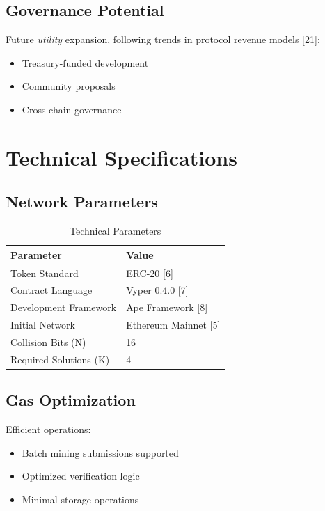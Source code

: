 \documentclass[11pt,a4paper]{article}
\begin{document}
\subsection{Governance Potential}

Future \textit{utility} expansion, following trends in protocol revenue models [21]:
\begin{itemize}
    \item Treasury-funded development
    \item Community proposals
    \item Cross-chain governance
\end{itemize}

\section{Technical Specifications}

\subsection{Network Parameters}

\begin{table}[h]
\centering
\begin{tabular}{@{}ll@{}}
\toprule
\textbf{Parameter} & \textbf{Value} \\
\midrule
Token Standard & ERC-20 [6] \\
Contract Language & Vyper 0.4.0 [7] \\
Development Framework & Ape Framework [8] \\
Initial Network & Ethereum Mainnet [5] \\
Collision Bits (N) & 16 \\
Required Solutions (K) & 4 \\
\bottomrule
\end{tabular}
\caption{Technical Parameters}
\end{table}

\subsection{Gas Optimization}

Efficient operations:
\begin{itemize}
    \item Batch mining submissions supported
    \item Optimized verification logic
    \item Minimal storage operations
\end{itemize}
\end{document}
